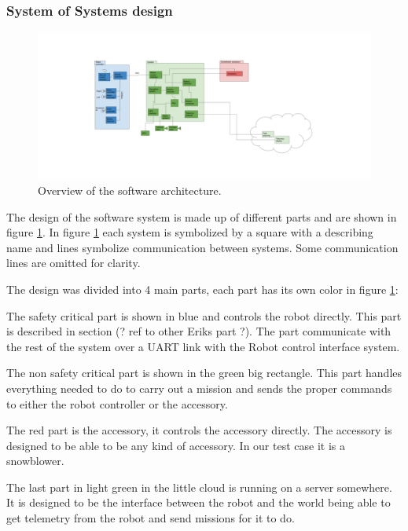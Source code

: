 \documentclass{article}
\begin{document}
\subsubsection{System of Systems design}
\label{sec:software:sos_design}

\begin{figure}[H]
    \includegraphics[width=\textwidth]{software_overview.png}
    \caption{Overview of the software architecture.}
    \label{fig:software_overview}
\end{figure}

The design of the software system is made up of different parts and are shown in figure \ref{fig:software_overview}. 
In figure \ref{fig:software_overview} each system is symbolized by a square with a describing name and
lines symbolize communication between systems. Some communication lines are omitted for clarity.

The design was divided into 4 main parts, each part has its own color in figure \ref{fig:software_overview}:

The safety critical part is shown in blue and controls the robot directly. This part is described in section (? ref to other Eriks part ?). The part communicate with the rest of the system over a UART \cite{IEEEUART} link with the Robot control interface system.

The non safety critical part is shown in the green big rectangle.
This part handles everything needed to do to carry out a mission and sends the proper commands to either the robot controller or the accessory.

The red part is the accessory, it controls the accessory directly.
The accessory is designed to be able to be any kind of accessory. In our test case it is a snowblower.

The last part in light green in the little cloud is running on a server somewhere. It is designed to be the interface between the robot and the world being able to get telemetry from the robot and send missions for it to do.
\end{document}
